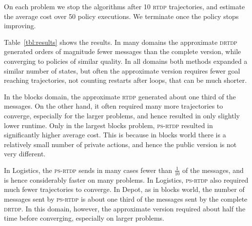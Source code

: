 \documentclass[letterpaper]{article} %
\newcommand{\rtdp}{\textsc {rtdp}\xspace}
\newcommand{\drtdp}{\textsc {drtdp}\xspace}
\newcommand{\psrtdp}{\textsc{ps}-\textsc{rtdp}\xspace}
\theoremstyle{remark}
\begin{document}
On each problem we stop the algorithms after 10 \rtdp trajectories, and estimate the average cost over 50 policy executions. We terminate once the policy stops improving.

Table~\ref{tbl:results} shows the results. In many domains the approximate \drtdp generated orders of magnitude fewer messages than the complete version, while converging to policies of similar quality. In all domains both methods expanded a similar number of states, but often the approximate version requires fewer goal reaching trajectories, not counting restarts after loops, that can be much shorter.

In the blocks domain, the approximate \rtdp generated about one third of the messages. On the other hand, it often required many more trajectories to converge, especially for the larger problems, and hence resulted in only slightly lower runtime. Only in the largest blocks problem, \psrtdp resulted in significantly higher average cost. This is because in blocks world there is a relatively small number of private actions, and hence the public version is not very different.

In Logistics, the \psrtdp sends in many cases fewer than $\frac{1}{10}$ of the messages, and is hence considerably faster on many problems. In Logistics, \psrtdp also required much fewer trajectories to converge.
In Depot, as in blocks world, the number of messages sent by \psrtdp is about one third of the messages sent by the complete \drtdp. In this domain, however, the approximate version required about half the time before converging, especially on larger problems.
\end{document}
